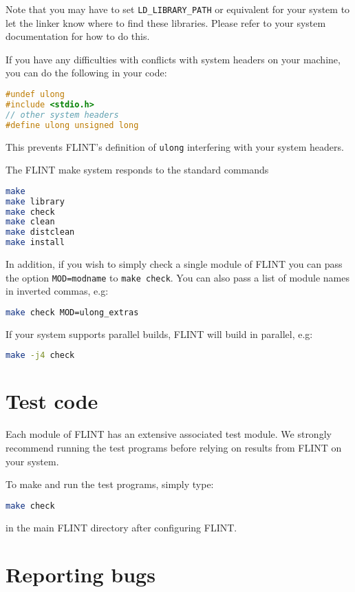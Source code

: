 \documentclass[a4paper,10pt]{book}
\newcommand{\code}{\lstinline}
\begin{document}
Note that you may have to set \code{LD_LIBRARY_PATH} or equivalent
for your system to let the linker know where to find these libraries.
Please refer to your system documentation for how to do this.

If you have any difficulties with conflicts with system headers on
your machine, you can do the following in your code:

\begin{lstlisting}[language=C]
#undef ulong
#include <stdio.h>
// other system headers
#define ulong unsigned long
\end{lstlisting}

This prevents FLINT's definition of \code{ulong} interfering with
your system headers.

The FLINT make system responds to the standard commands
\begin{lstlisting}[language=bash]
make 
make library
make check
make clean
make distclean
make install
\end{lstlisting}

In addition, if you wish to simply check a single module of FLINT you
can pass the option \code{MOD=modname} to \code{make check}. You can 
also pass a list of module names in inverted commas, e.g:

\begin{lstlisting}[language=bash]
make check MOD=ulong_extras
\end{lstlisting}

If your system supports parallel builds, FLINT will build in parallel,
e.g:
\begin{lstlisting}[language=bash]
make -j4 check 
\end{lstlisting}

\chapter{Test code}

Each module of FLINT has an extensive associated test module.  We 
strongly recommend running the test programs before relying on results 
from FLINT on your system. 

To make and run the test programs, simply type:
\begin{lstlisting}[language=bash]
make check
\end{lstlisting}

in the main FLINT directory after configuring FLINT.

\chapter{Reporting bugs}
\end{document}
